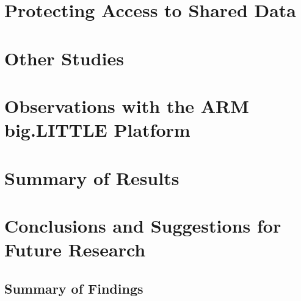 \documentclass[11pt]{book}
\begin{document}

\chapter{Protecting Access to Shared Data}\label{protection}


\chapter{Other Studies}\label{other}


\chapter{Observations with the ARM big.LITTLE Platform}\label{big_little}


\chapter{Summary of Results}\label{results_summary}



\chapter[Conclusions \& Future Research]{Conclusions and Suggestions for Future Research}\label{conclude}



\section{Summary of Findings}
\end{document}
